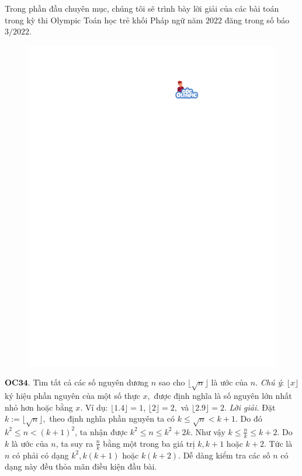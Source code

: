 \begin{multicols}{2}
	Trong phần đầu chuyên mục, chúng tôi sẽ trình bày lời giải của các bài toán trong kỳ thi Olympic Toán học trẻ khối Pháp ngữ năm $2022$ đăng trong số báo $3/2022$. 
	\begin{figure}[H]
		\vspace*{-5pt}
		\centering
		\captionsetup{labelformat= empty, justification=centering}
		\includegraphics[width= 1\linewidth]{gocolympic}
		\vspace*{-15pt}
	\end{figure}
	{\bf\color{cackithi} OC$\pmb{34.}$} Tìm tất cả các số nguyên dương $n$ sao cho $ \lfloor \sqrt{n}\rfloor $ là ước của $n.$ 
	\vskip 0.1cm
	\textit{Chú ý}: $ \lfloor x \rfloor $ ký hiệu phần nguyên của một số thực $x,$ được định nghĩa là số nguyên lớn nhất nhỏ hơn hoặc bằng $x.$ Ví dụ: $ \lfloor 1.4 \rfloor =1$, $ \lfloor 2 \rfloor=2,$ và  $ \lfloor 2.9 \rfloor= 2.$  
	\vskip 0.1cm 
	\textit{Lời giải.} Đặt $k:=\lfloor \sqrt{n}\rfloor,$ theo định nghĩa phần nguyên ta có $k\le \sqrt{n}< k+1.$ Do đó $k^2\le n < (k+1)^2$, ta nhận được $k^2\le n\le k^2+2k$. Như vậy $k\le \frac{n}{k}\le k+2.$ Do $k$ là ước của $n$, ta suy ra $\frac{n}{k}$  bằng  một trong ba giá trị $k, k+1$ hoặc $k+2$. Tức là $n$ có phải có dạng $k^2, k(k+1)$ hoặc $k(k+2)$. Dễ dàng kiểm tra các số $n$ có dạng này đều thỏa mãn điều kiện đầu bài.  

\end{multicols}
